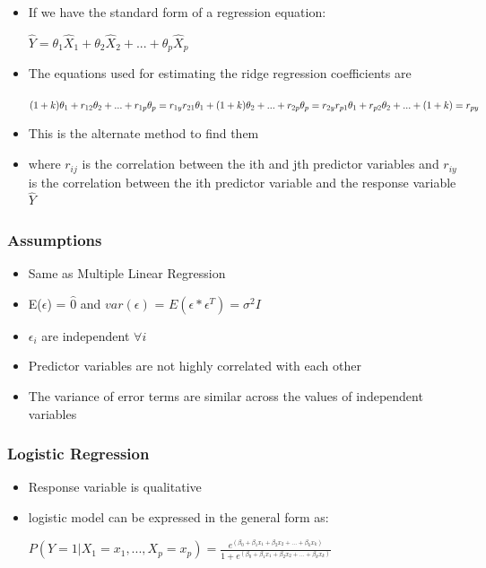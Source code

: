 \documentclass{beamer}
\begin{document}
\begin{frame}
	\begin{itemize}
		\item If we have the standard form of a regression equation:
		\begin{center}$
			\hat{Y}	= \theta_1\hat{X}_1 + \theta_2\hat{X}_2 + ... + \theta_p\hat{X}_p
			$\end{center}
		\item The equations used for estimating the ridge regression coefficients are
		\begin{center}
			$(1+k)\theta_1 + r_{12}\theta_2 + ... + r_{1p}\theta_p = r_{1y} \\
			r_{21}\theta_1 + (1+k)\theta_2 + ... + r_{2p}\theta_p = r_{2y} \\
			r_{p1}\theta_1 + r_{p2}\theta_2 + ... + (1+k) = r_{py}$
		\end{center}
	\item This is the alternate method to find them
	\item where $r_{ij}$ is the correlation between the ith and jth predictor variables and $r_{iy}$ is the correlation between the ith predictor variable and the response variable $\hat{Y}$
	\end{itemize}
\end{frame}
\begin{frame}
	\frametitle{Assumptions}
	\begin{itemize}
		\item Same as Multiple Linear Regression
		\item E($\epsilon$) = $\hat{0}$ and $var(\epsilon)$ = $E(\epsilon * \epsilon^T) = \sigma^2 I$ 
		\item $\epsilon_i$ are independent $\forall i$ 
		\item Predictor variables are not highly correlated with each other 
		\item The variance of error terms are similar across the values of independent variables
	\end{itemize}
\end{frame}
	\begin{frame}
		\frametitle{Logistic Regression}
		\begin{itemize}
		\item Response variable is qualitative	
		\item logistic model can be expressed in the general form as: 
		\begin{center}$
			P(Y=1|X_1 = x_1, ..., X_p = x_p) = \frac{e^{(\beta_0 + \beta_1x_1 + \beta_2x_2 + ... + \beta_kx_k)}}{1 + e^{(\beta_0 + \beta_1x_1 + \beta_2x_2 + ... + \beta_kx_k)}}
		$\end{center}
		\end{itemize}
	\end{frame}
\end{document}
